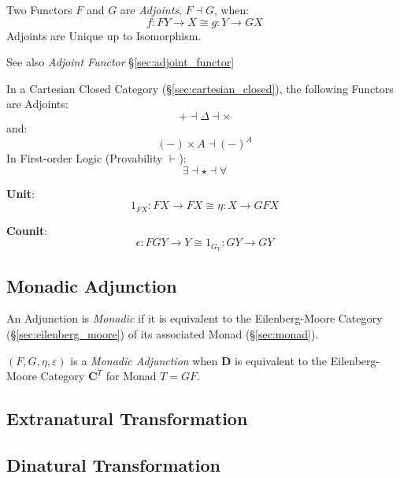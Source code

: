 Two Functors $F$ and $G$ are \emph{Adjoints}, $F \dashv G$, when:
\[
  f : F Y \rightarrow X \cong g : Y \rightarrow G X
\]
Adjoints are Unique up to Isomorphism.

See also \emph{Adjoint Functor} \S\ref{sec:adjoint_functor}

In a Cartesian Closed Category (\S\ref{sec:cartesian_closed}), the
following Functors are Adjoints:
\[
  + \dashv \Delta \dashv \times
\]
and:
\[
  (-) \times A \dashv (-)^A
\]
In First-order Logic (Provability $\vdash$):
\[
  \exists \dashv \star \dashv \forall
\]

\textbf{Unit}:
\[
  1_{F X}: F X \rightarrow F X \cong \eta : X \rightarrow G F X
\]

\textbf{Counit}:
\[
  \epsilon: F G Y \rightarrow Y \cong 1_{G_Y} : G Y \rightarrow G Y
\]



\subsection{Monadic Adjunction}\label{sec:monadic_adjunction}

An Adjunction is \emph{Monadic} if it is equivalent to the
Eilenberg-Moore Category (\S\ref{sec:eilenberg_moore}) of its
associated Monad (\S\ref{sec:monad}).

$(F,G,\eta,\varepsilon)$ is a \emph{Monadic Adjunction} when
$\mathbf{D}$ is equivalent to the Eilenberg-Moore Category
$\mathbf{C}^T$ for Monad $T = GF$.






\subsection{Extranatural Transformation}
\label{sec:extranatural_transformation}

\subsection{Dinatural Transformation}
\label{sec:dinatural_transformation}



